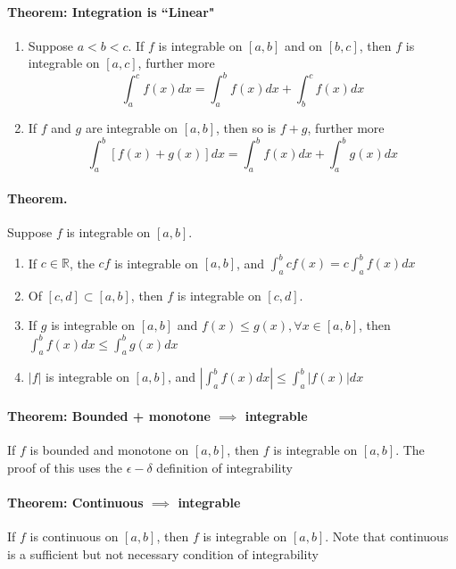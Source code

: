 \documentclass[11pt]{article}
\begin{document}
\paragraph{Theorem:  Integration is ``Linear"}
\begin{enumerate}
    \item Suppose $a < b<c$. If $f$ is integrable on $[a,b]$ and on $[b,c]$, then $f$ is integrable on $[a,c]$, further more
    \begin{equation*}
        \int_a^c f(x)dx = \int_a^b f(x)dx + \int_b^c f(x)dx
    \end{equation*}
    \item If $f$ and $g$ are integrable on $[a,b]$, then so is $f+g$, further more
    \begin{equation*}
        \int_a^b [f(x) + g(x)]dx = \int_a^b f(x)dx + \int_a^b g(x)dx
    \end{equation*}
\end{enumerate}

\paragraph{Theorem.} Suppose $f$ is integrable on $[a,b]$.
\begin{enumerate}
    \item If $c\in \mathbb{R}$, the $cf$ is integrable on $[a,b]$, and $\int_a^b cf(x) = c\int_a^bf(x)dx$
    \item Of $[c,d] \subset [a,b]$, then $f$ is integrable on $[c,d]$.
    \item If $g$ is integrable on $[a,b]$ and $f(x) \leq g(x),\forall x \in [a,b]$, then $\int_a^b f(x)dx\leq \int_a^b g(x)dx$
    \item $|f|$ is integrable on $[a,b]$, and $\left|\int_a^bf(x)dx\right| \leq \int_a^b |f(x)|dx$
\end{enumerate}

\paragraph{Theorem: Bounded + monotone $\implies$ integrable} If $f$ is bounded and monotone on $[a,b]$, then $f$ is integrable on $[a,b]$. The proof of this uses the $\epsilon-\delta$ definition of integrability

\paragraph{Theorem: Continuous $\implies$ integrable} If $f$ is continuous on $[a,b]$, then $f$ is integrable on $[a,b]$. Note that continuous is a sufficient but not necessary condition of integrability
\end{document}
